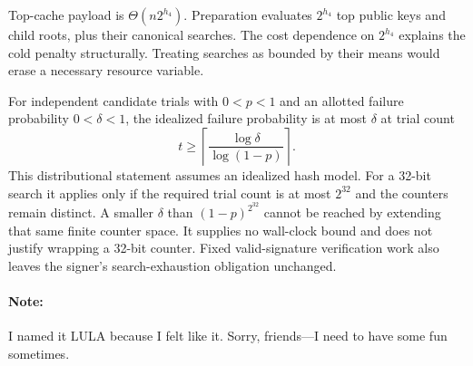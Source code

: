 \documentclass[a4paper,envcountsame,runningheads]{llncs}
\begin{document}
Top-cache payload is $\Theta(n2^{h_4})$. Preparation evaluates $2^{h_4}$ top public keys and child roots, plus their canonical searches. The cost dependence on $2^{h_4}$ explains the cold penalty structurally. Treating searches as bounded by their means would erase a necessary resource variable.

For independent candidate trials with $0<p<1$ and an allotted failure probability $0<\delta<1$, the idealized failure probability is at most $\delta$ at trial count
\[
 t\ge\left\lceil\frac{\log\delta}{\log(1-p)}\right\rceil.
\]
This distributional statement assumes an idealized hash model. For a 32-bit search it applies only if the required trial count is at most $2^{32}$ and the counters remain distinct. A smaller $\delta$ than $(1-p)^{2^{32}}$ cannot be reached by extending that same finite counter space. It supplies no wall-clock bound and does not justify wrapping a 32-bit counter. Fixed valid-signature verification work also leaves the signer's search-exhaustion obligation unchanged.

\FloatBarrier
\paragraph{Note:}
I named it LULA because I felt like it. Sorry, friends---I need to have some fun sometimes.
\end{document}
